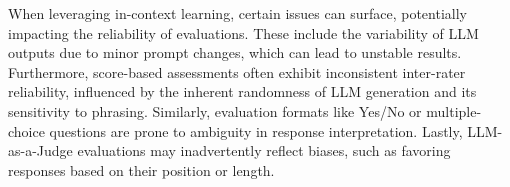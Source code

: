 
    













\begin{tcolorbox}[colback=white!5, colframe=black, title={Reliability Concerns of In-Context Learning}]
When leveraging in-context learning, certain issues can surface, potentially impacting the reliability of evaluations. These include the variability of LLM outputs due to minor prompt changes, which can lead to unstable results. Furthermore, score-based assessments often exhibit inconsistent inter-rater reliability, influenced by the inherent randomness of LLM generation and its sensitivity to phrasing. Similarly, evaluation formats like Yes/No or multiple-choice questions are prone to ambiguity in response interpretation. Lastly, LLM-as-a-Judge evaluations may inadvertently reflect biases, such as favoring responses based on their position or length. 
\end{tcolorbox}









